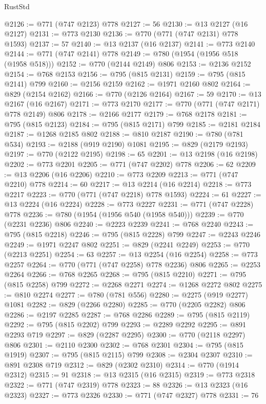 \begin{lexlean}{RustStd}
\begin{coremodule}
@2126 := @771 (@747 @2123) @778
@2127 := 56
@2130 := @13 @2127 (@16 @2127)
@2131 := @773 @2130
@2136 := @770 (@771 (@747 @2131) @778 @1593)
@2137 := 57
@2140 := @13 @2137 (@16 @2137)
@2141 := @773 @2140
@2144 := @771 (@747 @2141) @778
@2149 := @780 (@1954 (@1956 @518 (@1958 @518)))
@2152 := @770 (@2144 @2149) @806
@2153 := @2136 @2152
@2154 := @768 @2153
@2156 := @795 (@815 @2131)
@2159 := @795 (@815 @2141) @799
@2160 := @2156 @2159
@2162 := @1971 @2160 @802
@2164 := @829 (@2154 @2162)
@2166 := @770 (@2126 @2164)
@2167 := 59
@2170 := @13 @2167 (@16 @2167)
@2171 := @773 @2170
@2177 := @770 (@771 (@747 @2171) @778 @2149) @806
@2178 := @2166 @2177
@2179 := @768 @2178
@2181 := @795 (@815 @2123)
@2184 := @795 (@815 @2171) @799
@2185 := @2181 @2184
@2187 := @1268 @2185 @802
@2188 := @810 @2187
@2190 := @780 (@781 @534)
@2193 := @2188 (@919 @2190) @1081
@2195 := @829 (@2179 @2193)
@2197 := @770 (@2122 @2195)
@2198 := 65
@2201 := @13 @2198 (@16 @2198)
@2202 := @773 @2201
@2205 := @771 (@747 @2202) @778
@2206 := 62
@2209 := @13 @2206 (@16 @2206)
@2210 := @773 @2209
@2213 := @771 (@747 @2210) @778
@2214 := 60
@2217 := @13 @2214 (@16 @2214)
@2218 := @773 @2217
@2223 := @770 (@771 (@747 @2218) @778 @1593)
@2224 := 61
@2227 := @13 @2224 (@16 @2224)
@2228 := @773 @2227
@2231 := @771 (@747 @2228) @778
@2236 := @780 (@1954 (@1956 @540 (@1958 @540)))
@2239 := @770 (@2231 @2236) @806
@2240 := @2223 @2239
@2241 := @768 @2240
@2243 := @795 (@815 @2218)
@2246 := @795 (@815 @2228) @799
@2247 := @2243 @2246
@2249 := @1971 @2247 @802
@2251 := @829 (@2241 @2249)
@2253 := @770 (@2213 @2251)
@2254 := 63
@2257 := @13 @2254 (@16 @2254)
@2258 := @773 @2257
@2264 := @770 (@771 (@747 @2258) @778 @2236) @806
@2265 := @2253 @2264
@2266 := @768 @2265
@2268 := @795 (@815 @2210)
@2271 := @795 (@815 @2258) @799
@2272 := @2268 @2271
@2274 := @1268 @2272 @802
@2275 := @810 @2274
@2277 := @780 (@781 @556)
@2280 := @2275 (@919 @2277) @1081
@2282 := @829 (@2266 @2280)
@2285 := @770 (@2205 @2282) @806
@2286 := @2197 @2285
@2287 := @768 @2286
@2289 := @795 (@815 @2119)
@2292 := @795 (@815 @2202) @799
@2293 := @2289 @2292
@2295 := @891 @2293 @719
@2297 := @829 (@2287 @2295)
@2300 := @770 (@2118 @2297) @806
@2301 := @2110 @2300
@2302 := @768 @2301
@2304 := @795 (@815 @1919)
@2307 := @795 (@815 @2115) @799
@2308 := @2304 @2307
@2310 := @891 @2308 @719
@2312 := @829 (@2302 @2310)
@2314 := @770 (@1914 @2312)
@2315 := 91
@2318 := @13 @2315 (@16 @2315)
@2319 := @773 @2318
@2322 := @771 (@747 @2319) @778
@2323 := 88
@2326 := @13 @2323 (@16 @2323)
@2327 := @773 @2326
@2330 := @771 (@747 @2327) @778
@2331 := 76

\end{coremodule}
\end{lexlean}
